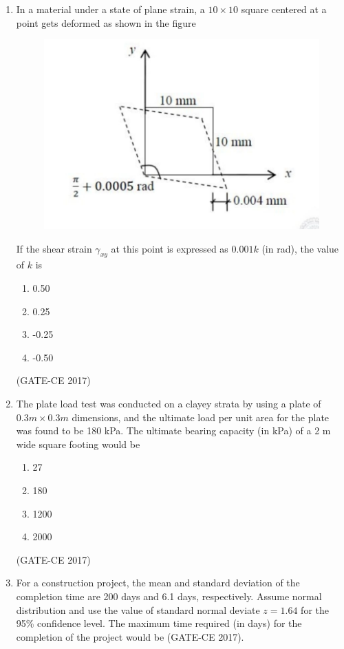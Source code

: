 \documentclass[journal,12pt,onecolumn]{article}
\theoremstyle{remark}
\begin{document}
\begin{enumerate}
    \item In a material under a state of plane strain, a $10 \times 10$ square centered at a point gets deformed as shown in the figure 
    \begin{figure}[H]
    \centering
    \includegraphics[width=0.7\columnwidth]{figs/q16.jpg}  
    \caption{}
    \label{fig:6}
    \end{figure}
    If the shear strain $ \gamma_{xy} $ at this point is expressed as $0.001k$ (in rad), the value of $ k $ is
    \begin{multicols}{4}
    \begin{enumerate}
        \item 0.50  
        \item 0.25  
        \item -0.25  
        \item -0.50  
    \end{enumerate}
    \end{multicols}
    \hfill (GATE-CE 2017)

    \item The plate load test was conducted on a clayey strata by using a plate of $0.3m\times0.3m$ dimensions, and the ultimate load per unit area for the plate was found to be 180 kPa. The ultimate bearing capacity (in kPa) of a 2 m wide square footing would be
    \begin{multicols}{4}
    \begin{enumerate}
        \item 27  
        \item 180  
        \item 1200  
        \item 2000  
    \end{enumerate}
    \end{multicols}
    \hfill (GATE-CE 2017)

    \item For a construction project, the mean and standard deviation of the completion time are 200 days and 6.1 days, respectively. Assume normal distribution and use the value of standard normal deviate $ z = 1.64 $ for the 95\% confidence level. The maximum time required (in days) for the completion of the project would be \underline{\hspace{3cm}} \hfill (GATE-CE 2017).


\end{enumerate}
\end{document}
